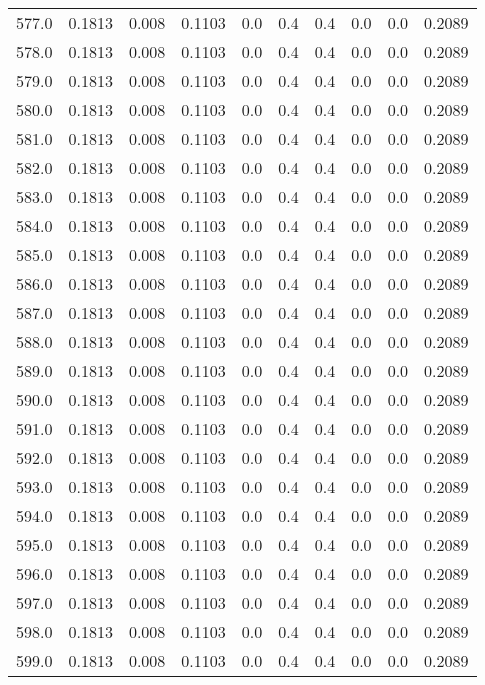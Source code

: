 \begin{longtable}{lrrrrrrrrr}
577.0 & 0.1813 & 0.008 & 0.1103 & 0.0 & 0.4 & 0.4 & 0.0 & 0.0 & 0.2089 \\
578.0 & 0.1813 & 0.008 & 0.1103 & 0.0 & 0.4 & 0.4 & 0.0 & 0.0 & 0.2089 \\
579.0 & 0.1813 & 0.008 & 0.1103 & 0.0 & 0.4 & 0.4 & 0.0 & 0.0 & 0.2089 \\
580.0 & 0.1813 & 0.008 & 0.1103 & 0.0 & 0.4 & 0.4 & 0.0 & 0.0 & 0.2089 \\
581.0 & 0.1813 & 0.008 & 0.1103 & 0.0 & 0.4 & 0.4 & 0.0 & 0.0 & 0.2089 \\
582.0 & 0.1813 & 0.008 & 0.1103 & 0.0 & 0.4 & 0.4 & 0.0 & 0.0 & 0.2089 \\
583.0 & 0.1813 & 0.008 & 0.1103 & 0.0 & 0.4 & 0.4 & 0.0 & 0.0 & 0.2089 \\
584.0 & 0.1813 & 0.008 & 0.1103 & 0.0 & 0.4 & 0.4 & 0.0 & 0.0 & 0.2089 \\
585.0 & 0.1813 & 0.008 & 0.1103 & 0.0 & 0.4 & 0.4 & 0.0 & 0.0 & 0.2089 \\
586.0 & 0.1813 & 0.008 & 0.1103 & 0.0 & 0.4 & 0.4 & 0.0 & 0.0 & 0.2089 \\
587.0 & 0.1813 & 0.008 & 0.1103 & 0.0 & 0.4 & 0.4 & 0.0 & 0.0 & 0.2089 \\
588.0 & 0.1813 & 0.008 & 0.1103 & 0.0 & 0.4 & 0.4 & 0.0 & 0.0 & 0.2089 \\
589.0 & 0.1813 & 0.008 & 0.1103 & 0.0 & 0.4 & 0.4 & 0.0 & 0.0 & 0.2089 \\
590.0 & 0.1813 & 0.008 & 0.1103 & 0.0 & 0.4 & 0.4 & 0.0 & 0.0 & 0.2089 \\
591.0 & 0.1813 & 0.008 & 0.1103 & 0.0 & 0.4 & 0.4 & 0.0 & 0.0 & 0.2089 \\
592.0 & 0.1813 & 0.008 & 0.1103 & 0.0 & 0.4 & 0.4 & 0.0 & 0.0 & 0.2089 \\
593.0 & 0.1813 & 0.008 & 0.1103 & 0.0 & 0.4 & 0.4 & 0.0 & 0.0 & 0.2089 \\
594.0 & 0.1813 & 0.008 & 0.1103 & 0.0 & 0.4 & 0.4 & 0.0 & 0.0 & 0.2089 \\
595.0 & 0.1813 & 0.008 & 0.1103 & 0.0 & 0.4 & 0.4 & 0.0 & 0.0 & 0.2089 \\
596.0 & 0.1813 & 0.008 & 0.1103 & 0.0 & 0.4 & 0.4 & 0.0 & 0.0 & 0.2089 \\
597.0 & 0.1813 & 0.008 & 0.1103 & 0.0 & 0.4 & 0.4 & 0.0 & 0.0 & 0.2089 \\
598.0 & 0.1813 & 0.008 & 0.1103 & 0.0 & 0.4 & 0.4 & 0.0 & 0.0 & 0.2089 \\
599.0 & 0.1813 & 0.008 & 0.1103 & 0.0 & 0.4 & 0.4 & 0.0 & 0.0 & 0.2089 \\

\end{longtable}
